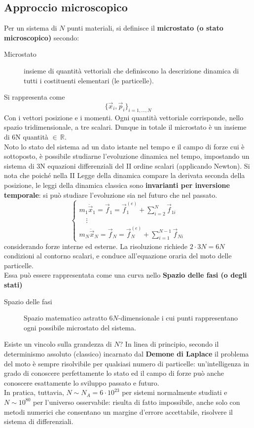 \documentclass[10pt, oneside]{book}
\begin{document}
\subsection{Approccio microscopico}
Per un sistema di $N$ punti materiali, si definisce il \textbf{microstato (o stato microscopico)} secondo:
\begin{description}
\item[Microstato] insieme di quantità vettoriali che definiscono la descrizione dinamica di tutti i costituenti elementari (le particelle).
\end{description}
Si rappresenta come
\[\{\vec{x}_i, \vec{p}_i\}_{i = 1, ..., N}\]
Con i vettori posizione e i momenti. Ogni quantità vettoriale corrisponde, nello spazio tridimensionale, a tre scalari. Dunque in totale il microstato è un insieme di 6N quantità $\displaystyle \in \, \mathbb{R}$.
\\Noto lo stato del sistema ad un dato istante nel tempo e il campo di forze cui è sottoposto, è possibile studiarne l'evoluzione dinamica nel tempo, impostando un sistema di 3N equazioni differenziali del II ordine scalari (applicando Newton). Si nota che poiché nella II Legge della dinamica compare la derivata seconda della posizione, le leggi della dinamica classica sono \textbf{invarianti per inversione temporale}: si può studiare l'evoluzione sia nel futuro che nel passato.
\[\begin{cases}
m_1 \ddot{ \vec{x}}_1 = \vec{f}_1 = \vec{f}_1^{(e)} + \sum\limits_{i=2}^N \vec{f}_{1i}\\
\quad \vdots\\
m_N \ddot{ \vec{x}}_N = \vec{f}_N = \vec{f}_N^{(e)} + \sum\limits_{i=1}^{N-1} \vec{f}_{Ni}
\end{cases}\]
considerando forze interne ed esterne. La risoluzione richiede $2 \cdot 3N = 6N$ condizioni al contorno scalari, e conduce all'equazione oraria del moto delle particelle.
\\Essa può essere rappresentata come una curva nello \textbf{Spazio delle fasi (o degli stati)}
\begin{description}
\item[Spazio delle fasi] Spazio matematico astratto $6N$-dimensionale i cui punti rappresentano ogni possibile microstato del sistema.
\end{description}
Esiste un vincolo sulla grandezza di $N$? In linea di principio, secondo il determinismo assoluto (classico) incarnato dal \textbf{Demone di Laplace} il problema del moto è sempre risolvibile per qualsiasi numero di particelle: un'intelligenza in grado di conoscere perfettamente lo stato ed il campo di forze può anche conoscere esattamente lo sviluppo passato e futuro.
\\In pratica, tuttavia, $N \sim N_A = 6 \cdot 10^{23}$ per sistemi normalmente studiati e $N \sim 10^{80}$ per l'universo osservabile: risulta di fatto impossibile, anche solo con metodi numerici che consentano un margine d'errore accettabile, risolvere il sistema di differenziali.
\end{document}
